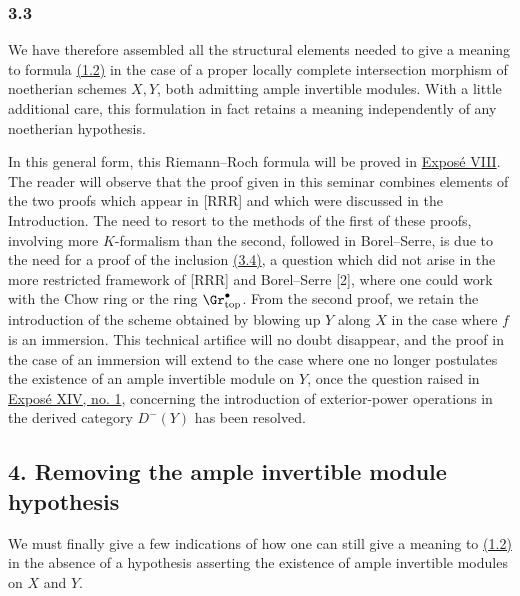 \subsubsection*{3.3}
We have therefore assembled all the structural elements needed to give a meaning to formula \hyperlink{sga6.e00.eq.1-2}{(1.2)} in the case of a proper locally complete intersection morphism of noetherian schemes $X,Y$, both admitting ample invertible modules. With a little additional care, this formulation in fact retains a meaning independently of any noetherian hypothesis.

In this general form, this Riemann--Roch formula will be proved in \hyperlink{sga6.e08.expose}{Expos\'e VIII}. The reader will observe that the proof given in this seminar combines elements of the two proofs which appear in [RRR] and which were discussed in the Introduction. The need to resort to the methods of the first of these proofs, involving more $K$-formalism than the second, followed in Borel--Serre, is due to the need for a proof of the inclusion \hyperlink{sga6.e00.eq.3-4}{(3.4)}, a question which did not arise in the more restricted framework of [RRR] and Borel--Serre [2], where one could work with the Chow ring or the ring $\Gr^\bullet_{\mathrm{top}}$. From the second proof, we retain the introduction of the scheme obtained by blowing up $Y$ along $X$ in the case where $f$ is an immersion. This technical artifice will no doubt disappear, and the proof in the case of an immersion will extend to the case where one no longer postulates the existence of an ample invertible module on $Y$, once the question raised in \hyperlink{sga6.e14.sec.1}{Expos\'e XIV, no. 1}, concerning the introduction of exterior-power operations in the derived category $D^-(Y)$ has been resolved.

\subsection*{4. Removing the ample invertible module hypothesis}
We must finally give a few indications of how one can still give a meaning to \hyperlink{sga6.e00.eq.1-2}{(1.2)} in the absence of a hypothesis asserting the existence of ample invertible modules on $X$ and $Y$.

